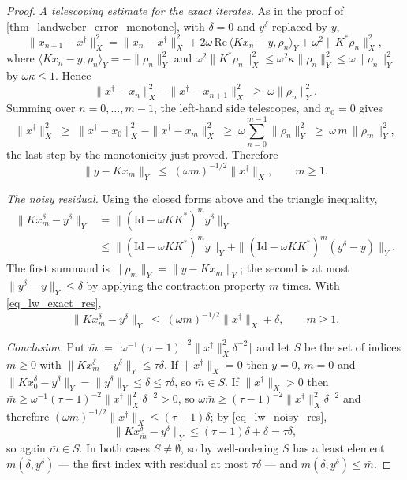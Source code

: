 \documentclass[a4paper]{report}
\theoremstyle{plain}
\theoremstyle{definition}
\theoremstyle{remark}
\newcommand{\Id}{\mathrm{Id}}
\newcommand{\dg}{^{\dagger}}
\begin{document}
\begin{proof}
  \emph{A telescoping estimate for the exact iterates.}  As in the proof of
  \cref{thm_landweber_error_monotone}, with $\delta = 0$ and $y^{\delta}$ replaced by $y$,
  \[
    \|x_{n+1} - x\dg\|_X^{2}
      = \|x_n - x\dg\|_X^{2}
        + 2\omega\,\mathrm{Re}\,\langle Kx_n - y, \rho_n\rangle_Y
        + \omega^{2}\|K^{*}\rho_n\|_X^{2} ,
  \]
  where $\langle Kx_n - y,\rho_n\rangle_Y = -\|\rho_n\|_Y^{2}$ and
  $\omega^{2}\|K^{*}\rho_n\|_X^{2} \le \omega^{2}\kappa\|\rho_n\|_Y^{2} \le
  \omega\|\rho_n\|_Y^{2}$ by $\omega\kappa \le 1$.  Hence
  \[
    \|x\dg - x_n\|_X^{2} - \|x\dg - x_{n+1}\|_X^{2} \;\ge\; \omega\|\rho_n\|_Y^{2} .
  \]
  Summing over $n = 0,\dots,m-1$, the left-hand side telescopes, and $x_0 = 0$ gives
  \[
    \|x\dg\|_X^{2} \;\ge\; \|x\dg - x_0\|_X^{2} - \|x\dg - x_m\|_X^{2}
      \;\ge\; \omega\sum_{n=0}^{m-1}\|\rho_n\|_Y^{2}
      \;\ge\; \omega\,m\,\|\rho_m\|_Y^{2} ,
  \]
  the last step by the monotonicity just proved.  Therefore
  \begin{equation}\label{eq_lw_exact_res}
    \|y - Kx_m\|_Y \;\le\; (\omega m)^{-1/2}\|x\dg\|_X , \qquad m \ge 1 .
  \end{equation}

  \emph{The noisy residual.}  Using the closed forms above and the triangle inequality,
  \[
    \begin{aligned}
      \|Kx^{\delta}_m - y^{\delta}\|_Y
        &= \|(\Id-\omega KK^{*})^{m}y^{\delta}\|_Y \\
        &\le \|(\Id-\omega KK^{*})^{m}y\|_Y
          + \|(\Id-\omega KK^{*})^{m}(y^{\delta}-y)\|_Y .
    \end{aligned}
  \]
  The first summand is $\|\rho_m\|_Y = \|y - Kx_m\|_Y$; the second is at most
  $\|y^{\delta}-y\|_Y \le \delta$ by applying the contraction property $m$ times.  With
  \eqref{eq_lw_exact_res},
  \begin{equation}\label{eq_lw_noisy_res}
    \|Kx^{\delta}_m - y^{\delta}\|_Y \;\le\; (\omega m)^{-1/2}\|x\dg\|_X + \delta ,
    \qquad m \ge 1 .
  \end{equation}

  \emph{Conclusion.}  Put
  $\bar{m} := \lceil \omega^{-1}(\tau-1)^{-2}\|x\dg\|_X^{2}\delta^{-2}\rceil$ and let $S$
  be the set of indices $m \ge 0$ with $\|Kx^{\delta}_m - y^{\delta}\|_Y \le \tau\delta$.
  If $\|x\dg\|_X = 0$ then $y = 0$, $\bar{m} = 0$ and
  $\|Kx^{\delta}_0 - y^{\delta}\|_Y = \|y^{\delta}\|_Y \le \delta \le \tau\delta$, so
  $\bar{m} \in S$.  If $\|x\dg\|_X > 0$ then $\bar{m} \ge \omega^{-1}(\tau-1)^{-2}
  \|x\dg\|_X^{2}\delta^{-2} > 0$, so $\omega\bar{m} \ge (\tau-1)^{-2}\|x\dg\|_X^{2}
  \delta^{-2}$ and therefore $(\omega\bar{m})^{-1/2}\|x\dg\|_X \le (\tau-1)\delta$;
  by \eqref{eq_lw_noisy_res},
  \[
    \|Kx^{\delta}_{\bar{m}} - y^{\delta}\|_Y \le (\tau-1)\delta + \delta = \tau\delta ,
  \]
  so again $\bar{m} \in S$.  In both cases $S \ne \emptyset$, so by well-ordering $S$ has
  a least element $m(\delta,y^{\delta})$ --- the first index with residual at most
  $\tau\delta$ --- and $m(\delta,y^{\delta}) \le \bar{m}$.
\end{proof}
\end{document}

